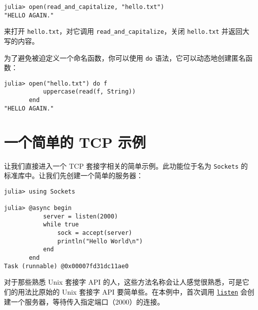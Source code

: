 \begin{verbatim}
julia> open(read_and_capitalize, "hello.txt")
"HELLO AGAIN."
\end{verbatim}



来打开 \texttt{hello.txt}，对它调用 \texttt{read\_and\_capitalize}，关闭 \texttt{hello.txt} 并返回大写的内容。



为了避免被迫定义一个命名函数，你可以使用 \texttt{do} 语法，它可以动态地创建匿名函数：




\begin{verbatim}
julia> open("hello.txt") do f
           uppercase(read(f, String))
       end
"HELLO AGAIN."
\end{verbatim}



\hypertarget{15377875155010529137}{}


\section{一个简单的 TCP 示例}



让我们直接进入一个 TCP 套接字相关的简单示例。此功能位于名为 \texttt{Sockets} 的标准库中。让我们先创建一个简单的服务器：




\begin{verbatim}
julia> using Sockets

julia> @async begin
           server = listen(2000)
           while true
               sock = accept(server)
               println("Hello World\n")
           end
       end
Task (runnable) @0x00007fd31dc11ae0
\end{verbatim}



对于那些熟悉 Unix 套接字 API 的人，这些方法名称会让人感觉很熟悉，可是它们的用法比原始的 Unix 套接字 API 要简单些。在本例中，首次调用 \hyperlink{780704944207038170}{\texttt{listen}} 会创建一个服务器，等待传入指定端口（2000）的连接。




